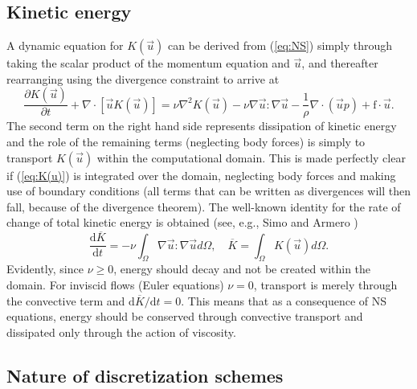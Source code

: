 \subsection{Kinetic energy}
\label{sec:kinetic}
A dynamic equation for $K(\vec{u})$ can be derived from (\ref{eq:NS}) simply through taking the scalar product of the momentum equation and $\vec{u}$, and thereafter rearranging using the divergence constraint to arrive at
\begin{equation}
 \frac{\partial K(\vec{u})}{\partial t} + \nabla \cdot [\vec{u}K(\vec{u})] = \nu \nabla^2 K(\vec{u}) -\nu \nabla \vec{u} : \nabla \vec{u} - \frac{1}{\rho}\nabla \cdot \left(\vec{u}p \right) +\text{f}\cdot \vec{u}.
 \label{eq:K(u)}
\end{equation}
The second term on the right hand side represents dissipation of kinetic energy and the role of the remaining terms (neglecting body forces) is simply to transport $K(\vec{u})$ within the computational domain. This is made perfectly clear if (\ref{eq:K(u)}) is integrated over the domain, neglecting body forces and making use of boundary conditions (all terms that can be written as divergences will then fall, because of the divergence theorem). The well-known identity for the rate of change of total kinetic energy is obtained (see, e.g., Simo and Armero \cite{SimoArmero1994})
\begin{equation}
 \frac{\text{d} \overline{K} }{\text{d} t} = - \nu \int_\Omega \nabla \vec{u} : \nabla \vec{u} d\Omega,
\quad \overline{K} = \int_{\Omega} K(\vec{u})d\Omega .
\end{equation}
Evidently, since $\nu \ge 0$, energy should decay and not be created within the domain. For inviscid flows (Euler equations) $\nu=0$, transport is merely through the convective term and $\text{d} \overline{K}/\text{d} t = 0$. This means that as a consequence of NS equations, energy should be conserved through convective transport and dissipated only through the action of viscosity.
\subsection{Nature of discretization schemes}
\label{sec:dissipative:dispersive}

